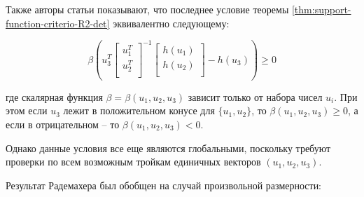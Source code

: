 \documentclass[a4paper, 12pt, titlepage]{article}
\theoremstyle{definition}
\theoremstyle{plain}
\theoremstyle{plain}
\begin{document}
Также авторы статьи показывают, что последнее условие теоремы
\ref{thm:support-function-criterio-R2-det} эквивалентно следующему:

\begin{equation}
 \beta \left( u_{3}^{T}
 \left[
 \begin{array}{c}
 u_{1}^{T} \\
 u_{2}^{T} \\
 \end{array}
 \right]^{-1}
 \left[
 \begin{array}{c}
 h(u_{1}) \\
 h(u_{2}) \\
 \end{array}
 \right] - h(u_{3}) \right) \geq 0
\end{equation}

где скалярная функция $\beta = \beta(u_{1}, u_{2}, u_{3})$ зависит только от
набора чисел $u_{i}$. При этом если $u_{3}$ лежит в положительном конусе для
$\{u_{1}, u_{2}\}$, то $\beta(u_{1}, u_{2}, u_{3}) \geq 0$, а если в
отрицательном -- то $\beta(u_{1}, u_{2}, u_{3}) < 0$.

Однако данные условия все еще являются глобальными, поскольку требуют проверки
по всем возможным тройкам единичных векторов $(u_{1}, u_{2}, u_{3})$.

Результат Радемахера был обобщен на случай произвольной размерности:
\end{document}
